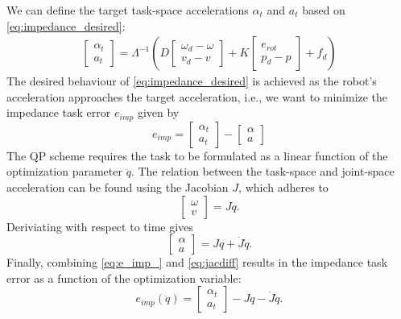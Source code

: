 \documentclass[a4paper, 10pt, conference]{ieeeconf}
\begin{document}
    We can define the target task-space accelerations $\alpha_t$ and $a_t$ based on \eqref{eq:impedance_desired}:
    \begin{align} \label{eq:imptask1}
    \begin{bmatrix} \alpha_{t} \\ a_{t} \end{bmatrix} 
   =    \Lambda^{-1} \left ( D \begin{bmatrix} \omega_d - {\omega} \\ v_d - v \end{bmatrix}  + K \begin{bmatrix} e_{rot} \\p_d - {p}  \end{bmatrix} +  f_{d} \right )
     \end{align}
    The desired behaviour of \eqref{eq:impedance_desired} is achieved as the robot's acceleration approaches the target acceleration, i.e., we want to minimize the impedance task error $e_{imp}$ given by
        \begin{equation} \label{eq:e_imp_} e_{imp} = 
    \begin{bmatrix} \alpha_t \\ a_t \end{bmatrix}-  \begin{bmatrix} \alpha \\ a \end{bmatrix}
    \end{equation}
    The QP scheme requires the task to be formulated as a linear function of the optimization parameter $\ddot{q}$. The relation between the task-space and joint-space acceleration can be found using the Jacobian $J$, which adheres to
    \begin{equation}
    \begin{bmatrix} \omega \\ v \end{bmatrix}=J\dot{q}.
    \end{equation}
    Deriviating with respect to time gives
    \begin{equation} \label{eq:jacdiff}
    \begin{bmatrix} \alpha \\ a \end{bmatrix}=J\ddot{q}+\dot{J}\dot{q}.
    \end{equation}    
    Finally, combining \eqref{eq:e_imp_} and \eqref{eq:jacdiff} results in the impedance task error as a function of the optimization variable:
        \begin{equation} \label{eq:e_imp} e_{imp}(\ddot{q}) = 
    \begin{bmatrix} \alpha_t \\ a_t \end{bmatrix}-  J\ddot{q}-\dot{J}\dot{q}.
    \end{equation}
\end{document}
